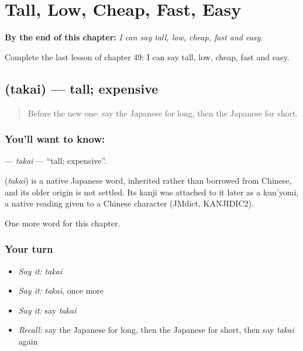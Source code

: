 
\chapter{Tall, Low, Cheap, Fast, Easy}
\label{ch:ja-tall-low-cheap-fast-easy}

\begin{chapteropening}
\textbf{By the end of this chapter:} \emph{I can say tall, low, cheap, fast and easy.}

Complete the last lesson of chapter 49: I can say tall, low, cheap, fast and easy.
\end{chapteropening}

\section[\texorpdfstring{\ja{たかい} (takai)}{たかい (takai)}]{ (takai) — tall; expensive}

\label{lesson:JA-C49-takai}



\begin{quote}
Before the new one: say the Japanese for long, then the Japanese for short.
\end{quote}

\subsection*{You'll want to know: }
\textbf{} — \emph{takai} — \textquotedblleft{}tall; expensive\textquotedblright{}.

\begin{cousinweb}
\textbf{} (\emph{takai}) is a native Japanese word, inherited rather than borrowed from Chinese, and its older origin is not settled. Its kanji was attached to it later as a kun'yomi, a native reading given to a Chinese character (JMdict, KANJIDIC2).
\end{cousinweb}

\begin{grammarlens}[title={What you've built}]
One more word for this chapter.
\end{grammarlens}

\subsection*{Your turn}
\begin{itemize}
\raggedright
  \item \emph{Say it:} \emph{takai}
  \item \emph{Say it:} \emph{takai}, once more
  \item \emph{Say it:} say \emph{takai}
  \item \emph{Recall:} say the Japanese for long, then the Japanese for short, then say \emph{takai} again
\end{itemize}

